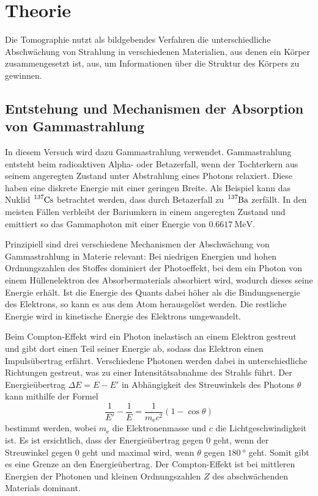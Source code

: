\section{Theorie}
\label{sec:Theorie}

Die Tomographie nutzt als bildgebendes Verfahren die unterschiedliche Abschwächung von Strahlung in verschiedenen Materialien, aus denen ein Körper zusammengesetzt ist, aus, um Informationen über die Struktur des Körpers zu gewinnen.

\subsection{Entstehung und Mechanismen der Absorption von Gammastrahlung}
\label{subsec:theorie1}

In diesem Versuch wird dazu Gammastrahlung verwendet. Gammastrahlung entsteht beim radioaktiven Alpha- oder Betazerfall, wenn der Tochterkern aus seinem angeregten Zustand unter Abstrahlung eines Photons relaxiert. Diese haben eine diskrete Energie mit einer geringen Breite.
Als Beispiel kann das Nuklid $\ce{^{137}Cs}$ betrachtet werden, dass durch Betazerfall zu $\ce{^{137}Ba}$ zerfällt. In den meisten Fällen verbleibt der Bariumkern in einem angeregten Zustand und emittiert so das Gammaphoton mit einer Energie von $\SI{0.6617}{\mega\electronvolt}$.

Prinzipiell sind drei verschiedene Mechanismen der Abschwächung von Gammastrahlung in Materie relevant: Bei niedrigen Energien und hohen Ordnungszahlen des Stoffes dominiert der Photoeffekt, bei dem ein Photon von einem Hüllenelektron des Absorbermaterials
absorbiert wird, wodurch dieses seine Energie erhält. Ist die Energie des Quants dabei höher als die Bindungsenergie des Elektrons, so kann es aus dem Atom herausgelöst werden. Die restliche Energie wird in kinetische Energie des Elektrons umgewandelt.

Beim Compton-Effekt wird ein Photon inelastisch an einem Elektron gestreut und gibt dort einen Teil seiner Energie ab, sodass das Elektron einen Impulsübertrag erfährt.
Verschiedene Photonen werden dabei in unterschiedliche Richtungen gestreut, was zu einer Intensitätsabnahme
des Strahls führt.
Der Energieübertrag $\Delta E = E - E'$ in Abhängigkeit des Streuwinkels des Photons $\theta$ kann mithilfe der Formel
\begin{equation}
	\frac{1}{E'} - \frac{1}{E} = \frac{1}{m_\text{e} c^2} (1-\cos\theta)
\end{equation}
bestimmt werden, wobei $m_\text{e}$ die Elektronenmasse und $c$ die Lichtgeschwindigkeit ist. Es ist ersichtlich, dass der Energieübertrag gegen 0 geht, wenn der Streuwinkel gegen 0 geht und maximal wird, wenn $\theta$ gegen $\SI{180}{\degree}$ geht. Somit gibt es eine Grenze an den Energieübertrag.
Der Compton-Effekt ist bei mittleren Energien der Photonen und kleinen Ordnungszahlen $Z$ des abschwächenden Materials dominant.

